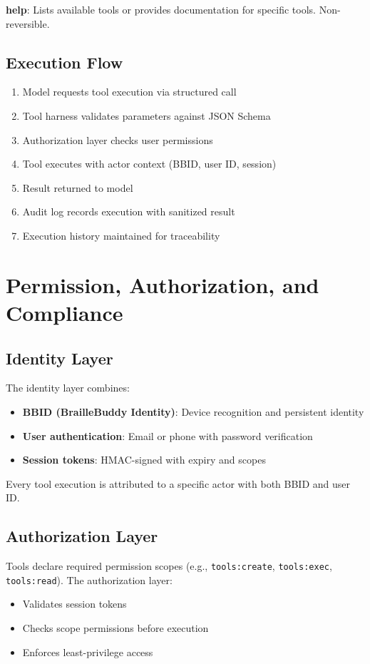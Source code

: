 \documentclass[11pt,a4paper]{article}
\begin{document}
\textbf{help}: Lists available tools or provides documentation for specific tools. Non-reversible.

\subsection{Execution Flow}

\begin{enumerate}
    \item Model requests tool execution via structured call
    \item Tool harness validates parameters against JSON Schema
    \item Authorization layer checks user permissions
    \item Tool executes with actor context (BBID, user ID, session)
    \item Result returned to model
    \item Audit log records execution with sanitized result
    \item Execution history maintained for traceability
\end{enumerate}

\section{Permission, Authorization, and Compliance}

\subsection{Identity Layer}

The identity layer combines:
\begin{itemize}
    \item \textbf{BBID (BrailleBuddy Identity)}: Device recognition and persistent identity
    \item \textbf{User authentication}: Email or phone with password verification
    \item \textbf{Session tokens}: HMAC-signed with expiry and scopes
\end{itemize}

Every tool execution is attributed to a specific actor with both BBID and user ID.

\subsection{Authorization Layer}

Tools declare required permission scopes (e.g., \texttt{tools:create}, \texttt{tools:exec}, \texttt{tools:read}). The authorization layer:
\begin{itemize}
    \item Validates session tokens
    \item Checks scope permissions before execution
    \item Enforces least-privilege access
\end{itemize}
\end{document}
